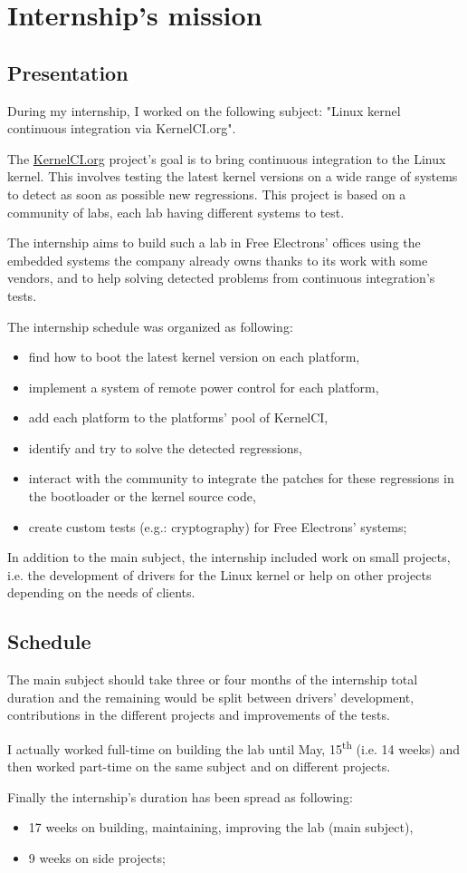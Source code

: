 \chapter{Internship's mission}

\section{Presentation}
During my internship, I worked on the following subject: "Linux kernel continuous integration via KernelCI.org".

The \href{https://kernelci.org}{KernelCI.org} project's goal is to bring continuous integration to the Linux kernel. This involves testing the latest kernel versions on a wide range of systems to detect as soon as possible new regressions. This project is based on a community of labs, each lab having different systems to test.

The internship aims to build such a lab in Free Electrons' offices using the embedded systems the company already owns thanks to its work with some vendors, and to help solving detected problems from continuous integration's tests.

The internship schedule was organized as following:
\begin{itemize}
  \item find how to boot the latest kernel version on each platform,
  \item implement a system of remote power control for each platform,
  \item add each platform to the platforms' pool of KernelCI,
  \item identify and try to solve the detected regressions,
  \item interact with the community to integrate the patches for these regressions in the bootloader or the kernel source code,
  \item create custom tests (e.g.: cryptography) for Free Electrons' systems;
\end{itemize}

In addition to the main subject, the internship included work on small projects, i.e. the development of drivers for the Linux kernel or help on other projects depending on the needs of clients.

\section{Schedule}
The main subject should take three or four months of the internship total duration and the remaining would be split between drivers' development, contributions in the different projects and improvements of the tests.

I actually worked full-time on building the lab until May, 15\textsuperscript{th} (i.e. 14 weeks) and then worked part-time on the same subject and on different projects.

Finally the internship's duration has been spread as following:
\begin{itemize}
  \item 17 weeks on building, maintaining, improving the lab (main subject),
  \item 9 weeks on side projects;
\end{itemize}
